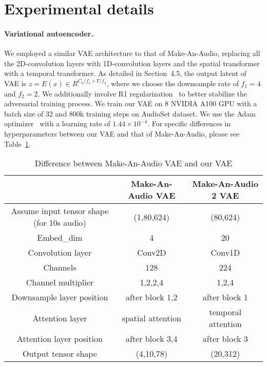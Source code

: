 \documentclass{article}
\begin{document}
\section{Experimental details}  \label{app:expeiment}
\paragraph{Variational autoencoder.}
 We employed a similar VAE architecture to that of Make-An-Audio, replacing all the 2D-convolution layers with 1D-convolution layers and the spatial transformer with a temporal transformer. As detailed in Section~4.5,  the output latent of VAE is $z=E(x)\in R^{C_a/f_1\times T/f_2}$, where we choose the downsample rate of $f_1=4$ and $f_2=2$. We additionally involve R1 regularization~\cite{r1reg} to better stabilize the adversarial training process. 
We train our VAE on 8 NVIDIA A100 GPU with a batch size of 32 and 800k training steps on AudioSet dataset. We use the Adam optimizer~\cite{kingma2014adam} with a learning rate of $1.44\times 10^{-4}$. For specific differences in hyperparameters between our VAE and that of Make-An-Audio, please see Table~\ref{tab:VAE_diff}.


\begin{table}[htbp]
  \centering
    \begin{tabular}{c|c|c}
    \toprule
      & Make-An-Audio VAE & Make-An-Audio 2 VAE \\
    \midrule 
    \multicolumn{1}{c|}{Assume input tensor shape (for 10s audio)} & (1,80,624) & (80,624) \\
    Embed\_dim & 4      & 20 \\
    Convolution layer & Conv2D & Conv1D \\ 
    Channels & 128    & 224 \\
    Channel multiplier & 1,2,2,4 & 1,2,4 \\
    Downsample layer position & after block 1,2 & after block 1 \\
    Attention layer & spatial attention & temporal attention \\
    Attention layer position & after block 3,4 & after block 3 \\
    Output tensor shape & (4,10,78) & (20,312) \\
    \bottomrule
    \end{tabular}\vspace{5pt}
  \caption{Difference between Make-An-Audio VAE and our VAE}
  \label{tab:VAE_diff}\end{table}
\end{document}
